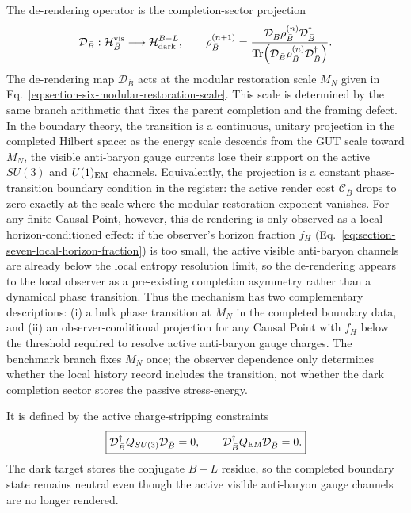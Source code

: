 \documentclass[11pt]{article}
\DeclareMathOperator{\Tr}{Tr}
\begin{document}
The de-rendering operator is the completion-sector projection
\begin{equation}
\label{eq:section-six-derendering-operator}
 \mathcal D_{\bar B}:
 \mathcal H_{\bar B}^{\rm vis}
 \longrightarrow
 \mathcal H_{\rm dark}^{B-L},
 \qquad
 \rho_{\bar B}^{(n+1)}
 =
 \frac{
 \mathcal D_{\bar B}\rho_{\bar B}^{(n)}\mathcal D_{\bar B}^{\dagger}}
 {\Tr\!\left(
 \mathcal D_{\bar B}\rho_{\bar B}^{(n)}\mathcal D_{\bar B}^{\dagger}
 \right)}.
\end{equation}
The de-rendering map $\mathcal D_{\bar B}$ acts at the modular restoration
scale $M_N$ given in
Eq.~\eqref{eq:section-six-modular-restoration-scale}.  This scale is
determined by the same branch arithmetic that fixes the parent completion and
the framing defect.  In the boundary theory, the transition is a continuous,
unitary projection in the completed Hilbert space: as the energy scale descends
from the GUT scale toward $M_N$, the visible anti-baryon gauge currents lose
their support on the active $SU(3)$ and $U(1)_{\rm EM}$ channels.  Equivalently,
the projection is a constant phase-transition boundary condition in the
register: the active render cost $\mathcal C_{\bar B}$ drops to zero exactly at
the scale where the modular restoration exponent vanishes.  For any finite
Causal Point, however, this de-rendering is only observed as a local
horizon-conditioned effect: if the observer's horizon fraction $f_H$
(Eq.~\eqref{eq:section-seven-local-horizon-fraction}) is too small, the active
visible anti-baryon channels are already below the local entropy resolution
limit, so the de-rendering appears to the local observer as a pre-existing
completion asymmetry rather than a dynamical phase transition.  Thus the
mechanism has two complementary descriptions: (i) a bulk phase transition at
$M_N$ in the completed boundary data, and (ii) an observer-conditional
projection for any Causal Point with $f_H$ below the threshold required to
resolve active anti-baryon gauge charges.  The benchmark branch fixes $M_N$
once; the observer dependence only determines whether the local history record
includes the transition, not whether the dark completion sector stores the
passive stress-energy.

It is defined by the active charge-stripping constraints
\begin{equation}
\label{eq:section-six-stripping-constraints}
 \boxed{
 \mathcal D_{\bar B}^{\dagger}Q_{SU(3)}\mathcal D_{\bar B}=0,
 \qquad
 \mathcal D_{\bar B}^{\dagger}Q_{\rm EM}\mathcal D_{\bar B}=0.
 }
\end{equation}
The dark target stores the conjugate $B-L$ residue, so the completed boundary
state remains neutral even though the active visible anti-baryon gauge channels
are no longer rendered.
\end{document}
